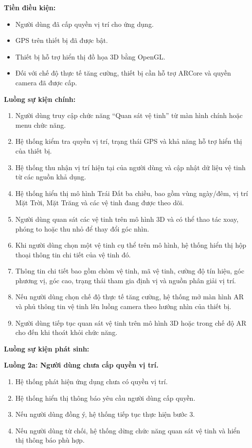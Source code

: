 \documentclass[../DoAn.tex]{subfiles}
\begin{document}
\textbf{Tiền điều kiện:}
\begin{itemize}
    \item Người dùng đã cấp quyền vị trí cho ứng dụng.
    \item GPS trên thiết bị đã được bật.
    \item Thiết bị hỗ trợ hiển thị đồ họa 3D bằng OpenGL.
    \item Đối với chế độ thực tế tăng cường, thiết bị cần hỗ trợ ARCore và quyền camera đã được cấp.
\end{itemize}

\textbf{Luồng sự kiện chính:}
\begin{enumerate}
    \item Người dùng truy cập chức năng ``Quan sát vệ tinh'' từ màn hình chính hoặc menu chức năng.
    \item Hệ thống kiểm tra quyền vị trí, trạng thái GPS và khả năng hỗ trợ hiển thị của thiết bị.
    \item Hệ thống thu nhận vị trí hiện tại của người dùng và cập nhật dữ liệu vệ tinh từ các nguồn khả dụng.
    \item Hệ thống hiển thị mô hình Trái Đất ba chiều, bao gồm vùng ngày/đêm, vị trí Mặt Trời, Mặt Trăng và các vệ tinh đang được theo dõi.
    \item Người dùng quan sát các vệ tinh trên mô hình 3D và có thể thao tác xoay, phóng to hoặc thu nhỏ để thay đổi góc nhìn.
    \item Khi người dùng chọn một vệ tinh cụ thể trên mô hình, hệ thống hiển thị hộp thoại thông tin chi tiết của vệ tinh đó.
    \item Thông tin chi tiết bao gồm chòm vệ tinh, mã vệ tinh, cường độ tín hiệu, góc phương vị, góc cao, trạng thái tham gia định vị và nguồn phân giải vị trí.
    \item Nếu người dùng chọn chế độ thực tế tăng cường, hệ thống mở màn hình AR và phủ thông tin vệ tinh lên luồng camera theo hướng nhìn của thiết bị.
    \item Người dùng tiếp tục quan sát vệ tinh trên mô hình 3D hoặc trong chế độ AR cho đến khi thoát khỏi chức năng.
\end{enumerate}

\textbf{Luồng sự kiện phát sinh:}

\textbf{Luồng 2a: Người dùng chưa cấp quyền vị trí.}
\begin{enumerate}[label=2a.\arabic*., leftmargin=2.6em, align=left, labelsep=0.5em]
    \item Hệ thống phát hiện ứng dụng chưa có quyền vị trí.
    \item Hệ thống hiển thị thông báo yêu cầu người dùng cấp quyền.
    \item Nếu người dùng đồng ý, hệ thống tiếp tục thực hiện bước 3.
    \item Nếu người dùng từ chối, hệ thống dừng chức năng quan sát vệ tinh và hiển thị thông báo phù hợp.
\end{enumerate}
\end{document}
